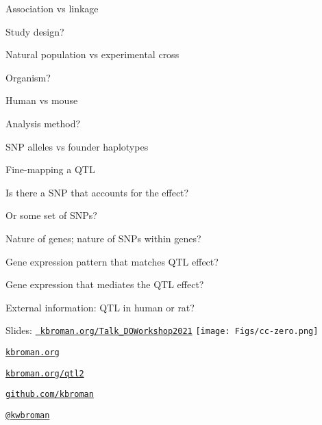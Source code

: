 \documentclass[12pt,t,aspectratio=169]{beamer}
\begin{document}
\begin{frame}{Association vs linkage}


  \bbi
\item Study design?
  \bi
\item[] Natural population vs experimental cross
  \ei
\item Organism?
  \bi
\item[] Human vs mouse
  \ei
\item Analysis method?
  \bi
\item[] SNP alleles vs founder haplotypes
  \ei
  \ei

\end{frame}



\begin{frame}{Fine-mapping a QTL}


  \bbi
\item Is there a SNP that accounts for the effect?
\item Or some set of SNPs?
\item Nature of genes; nature of SNPs within genes?
\item Gene expression pattern that matches QTL effect?
\item Gene expression that mediates the QTL effect?
\item External information: QTL in human or rat?
  \ei

\end{frame}




\begin{frame}[c]{}

\Large

{Slides:} \href{https://kbroman.org/Talk_DOWorkshop2021}{\tt
  \color{foreground} kbroman.org/Talk\_DOWorkshop2021} \quad
\texttt{[image: Figs/cc-zero.png]}

\vspace{7mm}

\href{https://kbroman.org}{\tt kbroman.org}

\vspace{7mm}

\href{https://kbroman.org/qtl2}{\tt kbroman.org/qtl2}

\vspace{7mm}

\href{https://github.com/kbroman}{\tt github.com/kbroman}

\vspace{7mm}

\href{https://twitter.com/kwbroman}{\tt @kwbroman}


\end{frame}
\end{document}
